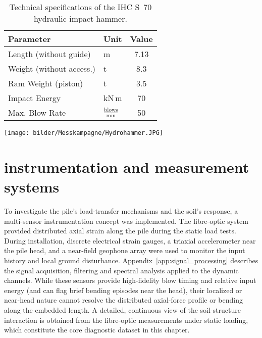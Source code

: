 {\begin{table}[htbp]
	\centering
	\caption{Technical specifications of the IHC S~70 hydraulic impact hammer.}
	\label{tab:Kenndaten_Schlaghammer}
	\begin{minipage}[c]{0.45\textwidth}
		\centering
		\begin{tabular}{@{}llc@{}}
			\toprule
			\textbf{Parameter} & \textbf{Unit} & \textbf{Value} \\
			\midrule
			Length (without guide) & m           & 7.13     \\
			Weight (without access.)    & t           & 8.3      \\
			Ram Weight (piston) & t           & 3.5      \\
			Impact Energy     & kN\,m         & 70       \\
			Max. Blow Rate        & $\frac{\text{blows}}{\text{min}}$ & 50       \\    
			\bottomrule
		\end{tabular}
	\end{minipage}
	\hspace{0.5cm}
	\begin{minipage}[c]{0.4\textwidth}
		\centering
		\texttt{[image: bilder/Messkampagne/Hydrohammer.JPG]}
	\end{minipage}
\end{table}
\section{instrumentation and measurement systems}

To investigate the pile's load-transfer mechanisms and the soil's response, a multi-sensor instrumentation concept was implemented.
The fibre-optic system provided distributed axial strain along the pile during the static load tests.
During installation, discrete electrical strain gauges, a triaxial accelerometer near the pile head, and a near-field geophone array were used to monitor the input history and local ground disturbance.
Appendix~\ref{app:signal_processing} describes the signal acquisition, filtering and spectral analysis applied to the dynamic channels. While these sensors provide high-fidelity blow timing and relative input energy (and can flag brief bending episodes near the head), their localized or near-head nature cannot resolve the distributed axial-force profile or bending along the embedded length. A detailed, continuous view of the soil-structure interaction is obtained from the fibre-optic measurements under static loading, which constitute the core diagnostic dataset in this chapter.

}

